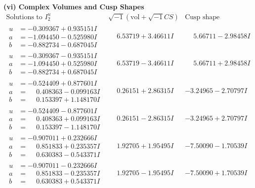\documentclass[1p]{elsarticle_modified}
\theoremstyle{definition}
\newcommand{\I}{\sqrt{-1}}
\begin{document}
\newpage\flushleft \textbf{(vi) Complex Volumes and Cusp Shapes}
$$\begin{array}{c|c|c}  
\text{Solutions to }I^u_{2}& \I (\text{vol} + \sqrt{-1}CS) & \text{Cusp shape}\\
 \hline 
\begin{aligned}
u &= -0.309367 + 0.935151 I \\
a &= -1.094450 - 0.525980 I \\
b &= -0.882734 - 0.687045 I\end{aligned}
 & \phantom{-}6.53719 + 3.46611 I & \phantom{-}5.66711 - 2.98458 I \\ \hline\begin{aligned}
u &= -0.309367 - 0.935151 I \\
a &= -1.094450 + 0.525980 I \\
b &= -0.882734 + 0.687045 I\end{aligned}
 & \phantom{-}6.53719 - 3.46611 I & \phantom{-}5.66711 + 2.98458 I \\ \hline\begin{aligned}
u &= -0.524409 + 0.877601 I \\
a &= \phantom{-}0.408363 - 0.099163 I \\
b &= \phantom{-}0.153397 + 1.148170 I\end{aligned}
 & \phantom{-}0.26151 + 2.86315 I & -3.24965 - 2.70797 I \\ \hline\begin{aligned}
u &= -0.524409 - 0.877601 I \\
a &= \phantom{-}0.408363 + 0.099163 I \\
b &= \phantom{-}0.153397 - 1.148170 I\end{aligned}
 & \phantom{-}0.26151 - 2.86315 I & -3.24965 + 2.70797 I \\ \hline\begin{aligned}
u &= -0.907011 + 0.232666 I \\
a &= \phantom{-}0.851833 + 0.235357 I \\
b &= \phantom{-}0.630383 - 0.543371 I\end{aligned}
 & \phantom{-}1.92705 + 1.95495 I & -7.50090 - 1.70539 I \\ \hline\begin{aligned}
u &= -0.907011 - 0.232666 I \\
a &= \phantom{-}0.851833 - 0.235357 I \\
b &= \phantom{-}0.630383 + 0.543371 I\end{aligned}
 & \phantom{-}1.92705 - 1.95495 I & -7.50090 + 1.70539 I \\ \hline\begin{aligned}

\end{aligned}
\end{array}$$
\end{document}

